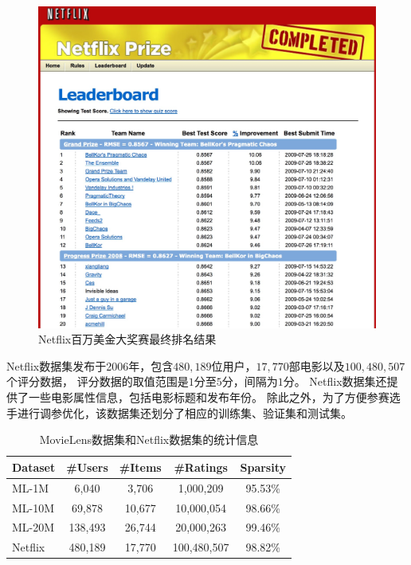 \begin{figure}[htbp]
\centering
\includegraphics[scale=0.2]{images/netflix.jpeg}
\caption{Netflix百万美金大奖赛最终排名结果}
\label{fig:netflix}
\end{figure}

Netflix数据集发布于2006年，包含$480,189$位用户，$17,770$部电影以及$100,480,507$个评分数据，
评分数据的取值范围是$1$分至$5$分，间隔为$1$分。
Netflix数据集还提供了一些电影属性信息，包括电影标题和发布年份。
除此之外，为了方便参赛选手进行调参优化，该数据集还划分了相应的训练集、验证集和测试集。

\begin{table}[htbp]
    \centering
    \caption{MovieLens数据集和Netflix数据集的统计信息}
    \label{tab:statistics1}
        \begin{tabular}{|l|c|c|c|c|}
        \hline
        \textbf{Dataset} & \textbf{\#Users} & \textbf{\#Items} & \textbf{\#Ratings} & \textbf{Sparsity} \\
        \hline
        ML-1M   & 6,040   & 3,706  & 1,000,209   & 95.53\% \\
        ML-10M  & 69,878  & 10,677 & 10,000,054  & 98.66\% \\
        ML-20M  & 138,493 & 26,744 & 20,000,263  & 99.46\% \\
        Netflix & 480,189 & 17,770 & 100,480,507 & 98.82\% \\
        \hline
    \end{tabular}
\end{table}

